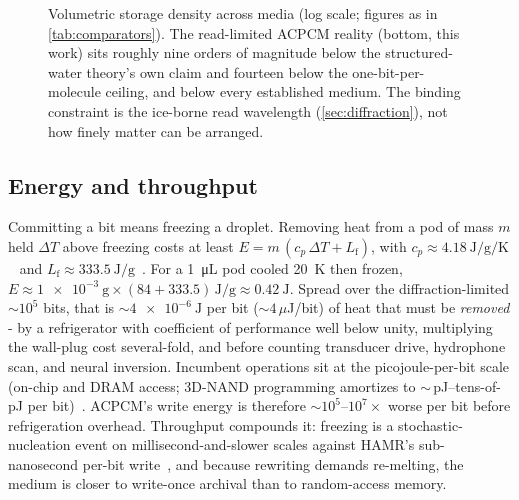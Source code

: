 \documentclass[11pt]{article}
\theoremstyle{definition}
\begin{document}
\begin{figure}[t]
\centering
{}
\caption{Volumetric storage density across media (log scale; figures as in \cref{tab:comparators}).
The read-limited ACPCM reality (bottom, this work) sits roughly nine orders of magnitude below the
structured-water theory's own claim and fourteen below the one-bit-per-molecule ceiling, and below
every established medium. The binding constraint is the ice-borne read wavelength
(\cref{sec:diffraction}), not how finely matter can be arranged.}
\label{fig:density}
\end{figure}

\subsection{Energy and throughput}
Committing a bit means freezing a droplet. Removing heat from a pod of mass $m$ held
$\Delta T$ above freezing costs at least $E = m\,(c_p\,\Delta T + L_{\mathrm{f}})$, with
$c_p\approx\qty{4.18}{\joule\per\gram\per\kelvin}$~\cite{iapws95} and
$L_{\mathrm{f}}\approx\qty{333.5}{\joule\per\gram}$~\cite{osborne1939fusion}. For a
\qty{1}{\micro\liter} pod cooled \qty{20}{\kelvin} then frozen,
$E\approx\qty{1e-3}{\gram}\times(84+333.5)\,\unit{\joule\per\gram}\approx\qty{0.42}{\joule}$.
Spread over the diffraction-limited ${\sim}10^{5}$ bits, that is ${\sim}\qty{4e-6}{\joule}$
per bit (${\sim}4\,\mu$J/bit) of heat that must be \emph{removed} - by a refrigerator with
coefficient of performance well below unity, multiplying the wall-plug cost several-fold,
and before counting transducer drive, hydrophone scan, and neural inversion. Incumbent
operations sit at the picojoule-per-bit scale (on-chip and DRAM access; 3D-NAND programming
amortizes to ${\sim}$\,pJ--tens-of-pJ per bit)~\cite{horowitz2014energy}. ACPCM's write
energy is therefore ${\sim}10^{5}$--$10^{7}\times$ worse per bit before refrigeration
overhead. Throughput compounds it: freezing is a stochastic-nucleation event on
millisecond-and-slower scales against HAMR's sub-nanosecond per-bit write~\cite{kryder2008hamr},
and because rewriting demands re-melting, the medium is closer to write-once archival than to
random-access memory.
\end{document}
